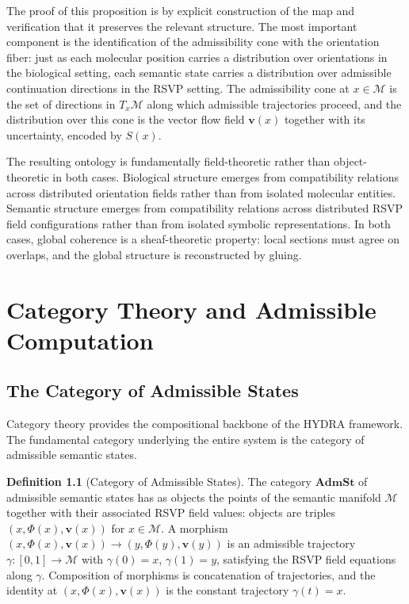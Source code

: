 \documentclass[12pt, a4paper, openany]{book}
\theoremstyle{plain}
\theoremstyle{definition}
\newtheorem{definition}[theorem]{Definition}
\theoremstyle{remark}
\newcommand{\vvec}{\mathbf{v}}
\newcommand{\Sfield}{S}
\begin{document}
The proof of this proposition is by explicit construction of the map and verification that it preserves the relevant structure. The most important component is the identification of the admissibility cone with the orientation fiber: just as each molecular position carries a distribution over orientations in the biological setting, each semantic state carries a distribution over admissible continuation directions in the RSVP setting. The admissibility cone at $x \in \mathcal{M}$ is the set of directions in $T_x \mathcal{M}$ along which admissible trajectories proceed, and the distribution over this cone is the vector flow field $\vvec(x)$ together with its uncertainty, encoded by $\Sfield(x)$.

The resulting ontology is fundamentally field-theoretic rather than object-theoretic in both cases. Biological structure emerges from compatibility relations across distributed orientation fields rather than from isolated molecular entities. Semantic structure emerges from compatibility relations across distributed RSVP field configurations rather than from isolated symbolic representations. In both cases, global coherence is a sheaf-theoretic property: local sections must agree on overlaps, and the global structure is reconstructed by gluing.

\chapter{Category Theory and Admissible Computation}

\section{The Category of Admissible States}

Category theory provides the compositional backbone of the HYDRA framework. The fundamental category underlying the entire system is the category of admissible semantic states.

\begin{definition}[Category of Admissible States]
The category $\mathbf{AdmSt}$ of admissible semantic states has as objects the points of the semantic manifold $\mathcal{M}$ together with their associated RSVP field values: objects are triples $(x, \Phi(x), \vvec(x))$ for $x \in \mathcal{M}$. A morphism $(x, \Phi(x), \vvec(x)) \to (y, \Phi(y), \vvec(y))$ is an admissible trajectory $\gamma: [0,1] \to \mathcal{M}$ with $\gamma(0) = x$, $\gamma(1) = y$, satisfying the RSVP field equations along $\gamma$. Composition of morphisms is concatenation of trajectories, and the identity at $(x, \Phi(x), \vvec(x))$ is the constant trajectory $\gamma(t) = x$.
\end{definition}
\end{document}

